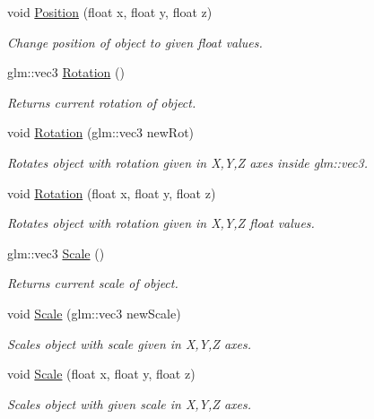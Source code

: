 \begin{DoxyCompactItemize}
void \mbox{\hyperlink{class_transform_a8d24b66e54f0489c03389a6424f0bb21}{Position}} (float x, float y, float z)
\begin{DoxyCompactList}\small\item\em Change position of object to given float values. \end{DoxyCompactList}\item 
glm\+::vec3 \mbox{\hyperlink{class_transform_a4d1718230fdc4dd8f3a0cf810cf223f4}{Rotation}} ()
\begin{DoxyCompactList}\small\item\em Returns current rotation of object. \end{DoxyCompactList}\item 
void \mbox{\hyperlink{class_transform_ae19384ad3a8fc19d997bab8be905eb8a}{Rotation}} (glm\+::vec3 new\+Rot)
\begin{DoxyCompactList}\small\item\em Rotates object with rotation given in X,Y,Z axes inside glm\+::vec3. \end{DoxyCompactList}\item 
void \mbox{\hyperlink{class_transform_a08eb7ce459e2be8c180741f29990583a}{Rotation}} (float x, float y, float z)
\begin{DoxyCompactList}\small\item\em Rotates object with rotation given in X,Y,Z float values. \end{DoxyCompactList}\item 
glm\+::vec3 \mbox{\hyperlink{class_transform_a60238a62017be874dea8514a4b172fcc}{Scale}} ()
\begin{DoxyCompactList}\small\item\em Returns current scale of object. \end{DoxyCompactList}\item 
void \mbox{\hyperlink{class_transform_ab4af0a98c37f0284074e30e3d6d2ca41}{Scale}} (glm\+::vec3 new\+Scale)
\begin{DoxyCompactList}\small\item\em Scales object with scale given in X,Y,Z axes. \end{DoxyCompactList}\item 
void \mbox{\hyperlink{class_transform_a0a30b57dd24261f559604ea64e69e0f9}{Scale}} (float x, float y, float z)
\begin{DoxyCompactList}\small\item\em Scales object with given scale in X,Y,Z axes. \end{DoxyCompactList}\item 

\end{DoxyCompactItemize}
